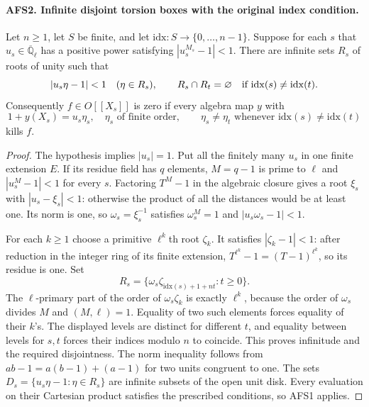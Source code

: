 \paragraph{AFS2. Infinite disjoint torsion boxes with the original index condition.}
\label{claim:AFS2}
Let $n\geq1$, let $S$ be finite, and let
$\mathrm{idx}:S\to\{0,\ldots,n-1\}$.  Suppose for each $s$ that
$u_s\in\overline{\mathbb Q}_\ell$ has a positive power
satisfying $|u_s^{M_s}-1|<1$.  There are infinite sets $R_s$ of
roots of unity such that
\[
 |u_s\eta-1|<1\quad(\eta\in R_s),\qquad
 R_s\cap R_t=\varnothing\quad\hbox{if }\mathrm{idx}(s)\ne\mathrm{idx}(t).
\]
Consequently $f\in O[[X_s]]$ is zero if every algebra map $y$
with
\[
 1+y(X_s)=u_s\eta_s,
 \quad\eta_s\text{ of finite order},\qquad
 \eta_s\ne\eta_t\text{ whenever }\mathrm{idx}(s)\ne\mathrm{idx}(t)
\]
kills $f$.
\begin{proof}
The hypothesis implies $|u_s|=1$.  Put all the finitely many $u_s$
in one finite extension $E$.  If its residue field has $q$ elements,
$M=q-1$ is prime to $\ell$ and $|u_s^M-1|<1$ for every $s$.
Factoring $T^M-1$ in the algebraic closure gives a root $\xi_s$
with $|u_s-\xi_s|<1$: otherwise the product of all the distances
would be at least one.  Its norm is one, so
$\omega_s=\xi_s^{-1}$ satisfies
$\omega_s^M=1$ and $|u_s\omega_s-1|<1$.

For each $k\geq1$ choose a primitive $\ell^k$th root $\zeta_k$.
It satisfies $|\zeta_k-1|<1$: after reduction in the integer ring
of its finite extension, $T^{\ell^k}-1=(T-1)^{\ell^k}$, so its
residue is one.  Set
\[
 R_s=\{\omega_s\zeta_{\mathrm{idx}(s)+1+nt}:t\geq0\}.
\]
The $\ell$-primary part of the order of
$\omega_s\zeta_k$ is exactly $\ell^k$, because the order of
$\omega_s$ divides $M$ and $(M,\ell)=1$.  Equality of two such
elements forces equality of their $k$'s.  The displayed levels
are distinct for different $t$, and equality between levels for
$s,t$ forces their indices modulo $n$ to coincide.  This proves
infinitude and the required disjointness.  The norm inequality
follows from
$ab-1=a(b-1)+(a-1)$ for two units congruent to one.
The sets $D_s=\{u_s\eta-1:\eta\in R_s\}$ are infinite subsets
of the open unit disk.  Every evaluation on their Cartesian
product satisfies the prescribed conditions, so AFS1 applies.
\end{proof}

